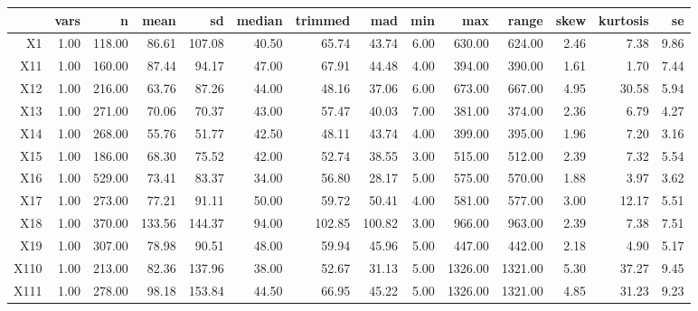 \begin{tabular}{rrrrrrrrrrrrrr}
  \hline
 & vars & n & mean & sd & median & trimmed & mad & min & max & range & skew & kurtosis & se \\ 
  \hline
X1 & 1.00 & 118.00 & 86.61 & 107.08 & 40.50 & 65.74 & 43.74 & 6.00 & 630.00 & 624.00 & 2.46 & 7.38 & 9.86 \\ 
  X11 & 1.00 & 160.00 & 87.44 & 94.17 & 47.00 & 67.91 & 44.48 & 4.00 & 394.00 & 390.00 & 1.61 & 1.70 & 7.44 \\ 
  X12 & 1.00 & 216.00 & 63.76 & 87.26 & 44.00 & 48.16 & 37.06 & 6.00 & 673.00 & 667.00 & 4.95 & 30.58 & 5.94 \\ 
  X13 & 1.00 & 271.00 & 70.06 & 70.37 & 43.00 & 57.47 & 40.03 & 7.00 & 381.00 & 374.00 & 2.36 & 6.79 & 4.27 \\ 
  X14 & 1.00 & 268.00 & 55.76 & 51.77 & 42.50 & 48.11 & 43.74 & 4.00 & 399.00 & 395.00 & 1.96 & 7.20 & 3.16 \\ 
  X15 & 1.00 & 186.00 & 68.30 & 75.52 & 42.00 & 52.74 & 38.55 & 3.00 & 515.00 & 512.00 & 2.39 & 7.32 & 5.54 \\ 
  X16 & 1.00 & 529.00 & 73.41 & 83.37 & 34.00 & 56.80 & 28.17 & 5.00 & 575.00 & 570.00 & 1.88 & 3.97 & 3.62 \\ 
  X17 & 1.00 & 273.00 & 77.21 & 91.11 & 50.00 & 59.72 & 50.41 & 4.00 & 581.00 & 577.00 & 3.00 & 12.17 & 5.51 \\ 
  X18 & 1.00 & 370.00 & 133.56 & 144.37 & 94.00 & 102.85 & 100.82 & 3.00 & 966.00 & 963.00 & 2.39 & 7.38 & 7.51 \\ 
  X19 & 1.00 & 307.00 & 78.98 & 90.51 & 48.00 & 59.94 & 45.96 & 5.00 & 447.00 & 442.00 & 2.18 & 4.90 & 5.17 \\ 
  X110 & 1.00 & 213.00 & 82.36 & 137.96 & 38.00 & 52.67 & 31.13 & 5.00 & 1326.00 & 1321.00 & 5.30 & 37.27 & 9.45 \\ 
  X111 & 1.00 & 278.00 & 98.18 & 153.84 & 44.50 & 66.95 & 45.22 & 5.00 & 1326.00 & 1321.00 & 4.85 & 31.23 & 9.23 \\ 
   \hline
\end{tabular}

